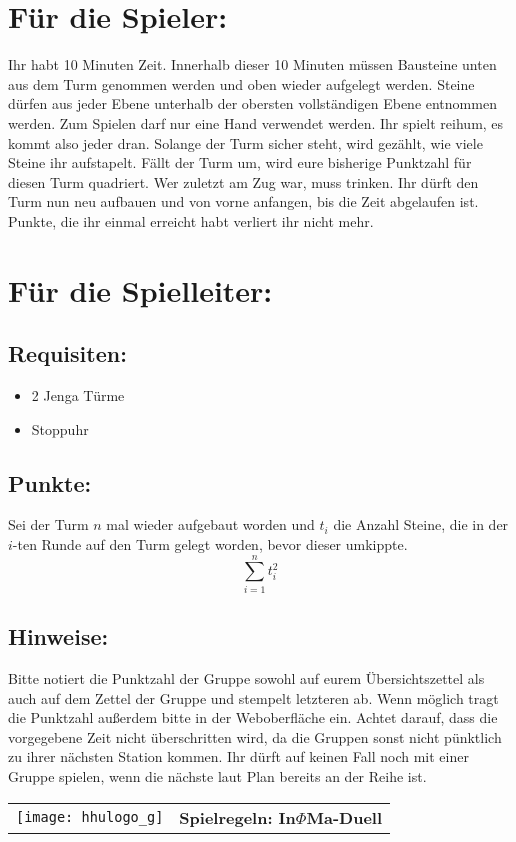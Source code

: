 \documentclass[a4paper,10pt]{article}
\def\spield{In$\Phi $Ma-Duell}
\newcommand{\unten}{
 Bitte notiert die Punktzahl der Gruppe sowohl auf eurem Übersichtszettel als auch auf dem Zettel der Gruppe und stempelt letzteren ab. Wenn möglich tragt die Punktzahl außerdem bitte in der Weboberfläche ein.
 Achtet darauf, dass die vorgegebene Zeit nicht überschritten wird, da die Gruppen sonst nicht pünktlich zu ihrer nächsten Station kommen. Ihr dürft auf keinen Fall noch mit einer Gruppe spielen, wenn die nächste laut Plan bereits an der Reihe ist.
}
\begin{document}
\Large
\section*{Für die Spieler:}
Ihr habt 10 Minuten Zeit. Innerhalb dieser 10 Minuten müssen Bausteine unten aus dem Turm genommen werden und oben wieder aufgelegt werden. Steine dürfen aus jeder Ebene unterhalb der obersten vollständigen Ebene entnommen werden. Zum Spielen darf nur eine Hand verwendet werden. Ihr spielt reihum, es kommt also jeder dran. Solange der Turm sicher steht, wird gezählt, wie viele Steine ihr aufstapelt. Fällt der Turm um, wird eure bisherige Punktzahl für diesen Turm quadriert. Wer zuletzt am Zug war, muss trinken. Ihr dürft den Turm nun neu aufbauen und von vorne anfangen, bis die Zeit abgelaufen ist. Punkte, die ihr einmal erreicht habt verliert ihr nicht mehr.

\section*{Für die Spielleiter:}
\subsection*{Requisiten:}
\begin{itemize}
 \item 2 Jenga Türme
 \item Stoppuhr
\end{itemize}
\subsection*{Punkte:}
Sei der Turm $n$ mal wieder aufgebaut worden und $t_i$ die Anzahl Steine, die in der $i$-ten Runde auf den Turm gelegt worden, bevor dieser umkippte.
 $$\sum_{i=1}^{n}t_i^2$$

\subsection*{Hinweise:}
\unten

\newpage


  \begin{tabularx}{\textwidth}{lc}
    \texttt{[image: hhulogo\_g]}
  & {\Huge \textbf{Spielregeln: \spield}}
  \end{tabularx}\\

\Large
\end{document}
